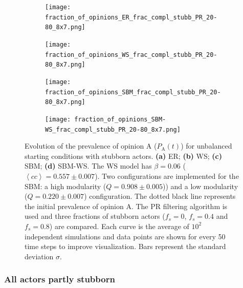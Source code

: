 \documentclass[11 pt , letterpaper , twoside , openright]{book}
\begin{document}
\begin{figure}[H]
  \begin{subfigure}[b]{0.49\textwidth}
    \caption{}
  	\texttt{[image: fraction\_of\_opinions\_ER\_frac\_compl\_stubb\_PR\_20-80\_8x7.png]}
  \end{subfigure}
  \begin{subfigure}[b]{0.49\textwidth}
    \caption{}
  	\texttt{[image: fraction\_of\_opinions\_WS\_frac\_compl\_stubb\_PR\_20-80\_8x7.png]}
  \end{subfigure}
  \begin{subfigure}[b]{0.49\textwidth}
    \caption{}
    \texttt{[image: fraction\_of\_opinions\_SBM\_frac\_compl\_stubb\_PR\_20-80\_8x7.png]}
  \end{subfigure}
  \begin{subfigure}[b]{0.49\textwidth}
    \caption{}
    \texttt{[image: fraction\_of\_opinions\_SBM-WS\_frac\_compl\_stubb\_PR\_20-80\_8x7.png]}
  \end{subfigure}
  \captionsetup{format=plain}
  \caption[Evolution of the prevalence of opinion A ($P_\text{A}(t)$) for unbalanced starting conditions with stubborn actors. The PR filtering algorithm is used and three fractions of stubborn actors ($f_s = 0$, $f_s = 0.4$ and $f_s = 0.8$) are compared.]{Evolution of the prevalence of opinion A ($P_\text{A}(t)$) for unbalanced starting conditions with stubborn actors. \textbf{(a)} ER; \textbf{(b)} WS; \textbf{(c)} SBM; \textbf{(d)} SBM-WS. The WS model has $\beta = 0.06$ ($\left<cc\right> = 0.557 \pm 0.007$). Two configurations are implemented for the SBM: a high modularity ($Q = 0.908 \pm 0.005$)) and a low modularity ($Q = 0.220 \pm 0.007$) configuration. The dotted black line represents the initial prevalence of opinion A. The PR filtering algorithm is used and three fractions of stubborn actors ($f_s = 0$, $f_s = 0.4$ and $f_s = 0.8$) are compared. Each curve is the average of $10^2$ independent simulations and data points are shown for every 50 time steps to improve visualization. Bars represent the standard deviation $\sigma$.}
\label{ev_op_20_80_stubb_PR}
\end{figure}

\subsubsection{All actors partly stubborn}
\end{document}
